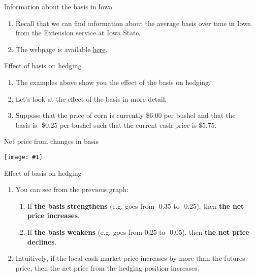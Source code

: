 \documentclass[table,xcolor=pdftex,dvipsnames]{beamer}\usepackage[]{graphicx}\usepackage[]{color}
\newcommand {\framedgraphic}[1] {
        \begin{center}
            \texttt{[image: \#1]}
        \end{center}
        \vspace{-1\baselineskip}
}
\begin{document}
\begin{frame}{Information about the basis in Iowa}
\begin{enumerate}[label=\textbullet]
    \item Recall that we can find information about the average basis over time in Iowa from the Extension service at Iowa State.
    \item The webpage is available \href{http://www.extension.iastate.edu/agdm/crops/html/a2-41.html}{here}.
\end{enumerate}
\end{frame}


\begin{frame}{Effect of basis on hedging}
\begin{enumerate}[label=\textbullet]
    \item The examples above show you the effect of the basis on hedging.
    \item Let's look at the effect of the basis in more detail.
    \item Suppose that the price of corn is currently \$6.00 per bushel and that the basis is -\$0.25 per bushel such that the current cash price is \$5.75.
\end{enumerate}
\end{frame}


\begin{frame}{Net price from changes in basis}
    \framedgraphic{hedging_basis.png}
\end{frame}


\begin{frame}{Effect of basis on hedging}
\begin{enumerate}[label=\textbullet]
    \item You can see from the previous graph:
        \begin{enumerate}[label=-]
            \item If \textbf{the basis strengthens} (e.g. goes from -0.35 to -0.25), then \textbf{the net price increases}.
            \item If \textbf{the basis weakens} (e.g. goes from 0.25 to -0.05), then \textbf{the net price declines}.
        \end{enumerate}
    \item Intuitively, if the local cash market price increases by more than the futures price, then the net price from the hedging position increases.
\end{enumerate}
\end{frame}
\end{document}
